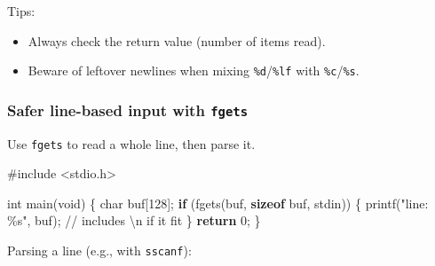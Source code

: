 \documentclass[
  letterpaper,
  DIV=11,
  numbers=noendperiod]{scrreprt}
\newenvironment{Shaded}{\begin{snugshade}}{\end{snugshade}}
\newcommand{\CommentTok}[1]{\textcolor[rgb]{0.37,0.37,0.37}{#1}}
\newcommand{\ControlFlowTok}[1]{\textcolor[rgb]{0.00,0.23,0.31}{\textbf{#1}}}
\newcommand{\DataTypeTok}[1]{\textcolor[rgb]{0.68,0.00,0.00}{#1}}
\newcommand{\DecValTok}[1]{\textcolor[rgb]{0.68,0.00,0.00}{#1}}
\newcommand{\ImportTok}[1]{\textcolor[rgb]{0.00,0.46,0.62}{#1}}
\newcommand{\KeywordTok}[1]{\textcolor[rgb]{0.00,0.23,0.31}{\textbf{#1}}}
\newcommand{\NormalTok}[1]{\textcolor[rgb]{0.00,0.23,0.31}{#1}}
\newcommand{\OperatorTok}[1]{\textcolor[rgb]{0.37,0.37,0.37}{#1}}
\newcommand{\PreprocessorTok}[1]{\textcolor[rgb]{0.68,0.00,0.00}{#1}}
\newcommand{\SpecialCharTok}[1]{\textcolor[rgb]{0.37,0.37,0.37}{#1}}
\newcommand{\StringTok}[1]{\textcolor[rgb]{0.13,0.47,0.30}{#1}}
\providecommand{\tightlist}{%
  \setlength{\itemsep}{0pt}\setlength{\parskip}{0pt}}
\begin{document}
Tips:

\begin{itemize}
\tightlist
\item
  Always check the return value (number of items read).
\item
  Beware of leftover newlines when mixing \texttt{\%d}/\texttt{\%lf}
  with \texttt{\%c}/\texttt{\%s}.
\end{itemize}

\subsubsection{\texorpdfstring{Safer line-based input with
\texttt{fgets}}{Safer line-based input with fgets}}\label{safer-line-based-input-with-fgets}

Use \texttt{fgets} to read a whole line, then parse it.

\begin{Shaded}
\begin{Highlighting}[]
\PreprocessorTok{\#include }\ImportTok{\textless{}stdio.h\textgreater{}}

\DataTypeTok{int}\NormalTok{ main}\OperatorTok{(}\DataTypeTok{void}\OperatorTok{)} \OperatorTok{\{}
    \DataTypeTok{char}\NormalTok{ buf}\OperatorTok{[}\DecValTok{128}\OperatorTok{];}
    \ControlFlowTok{if} \OperatorTok{(}\NormalTok{fgets}\OperatorTok{(}\NormalTok{buf}\OperatorTok{,} \KeywordTok{sizeof}\NormalTok{ buf}\OperatorTok{,}\NormalTok{ stdin}\OperatorTok{))} \OperatorTok{\{}
\NormalTok{        printf}\OperatorTok{(}\StringTok{"line: }\SpecialCharTok{\%s}\StringTok{"}\OperatorTok{,}\NormalTok{ buf}\OperatorTok{);}  \CommentTok{// includes \textquotesingle{}\textbackslash{}n\textquotesingle{} if it fit}
    \OperatorTok{\}}
    \ControlFlowTok{return} \DecValTok{0}\OperatorTok{;}
\OperatorTok{\}}
\end{Highlighting}
\end{Shaded}

Parsing a line (e.g., with \texttt{sscanf}):
\end{document}
